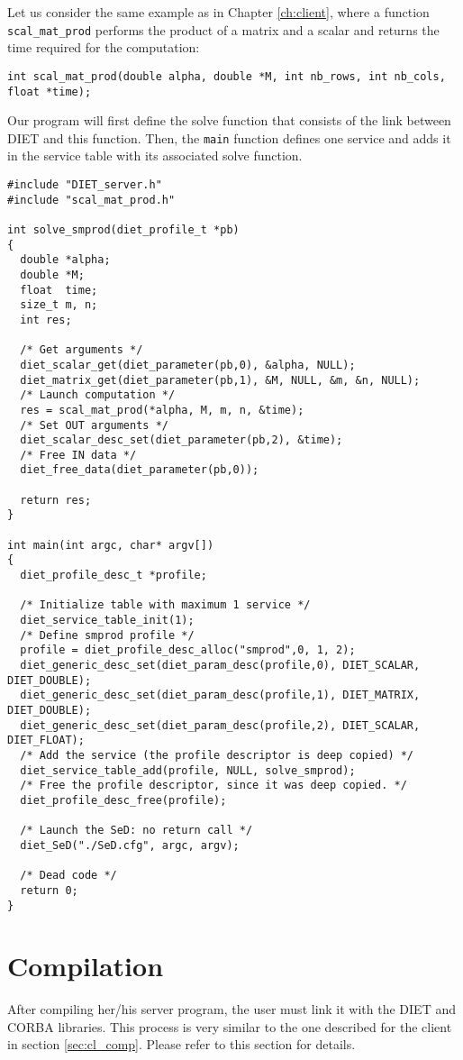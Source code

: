 Let us consider the same example as in Chapter \ref{ch:client}, where
a function \texttt{scal\_mat\_prod} performs the product of a matrix
and a scalar and returns the time required for the computation: {\footnotesize
\begin{verbatim}
int scal_mat_prod(double alpha, double *M, int nb_rows, int nb_cols, float *time);
\end{verbatim}
}
Our program will first define the solve function that consists of the link
between DIET and this function. Then, the \texttt{main} function defines one service and
adds it in the service table with its associated solve function.
{\footnotesize
\begin{verbatim}
#include "DIET_server.h"
#include "scal_mat_prod.h"

int solve_smprod(diet_profile_t *pb)
{
  double *alpha;
  double *M;
  float  time;
  size_t m, n;
  int res;

  /* Get arguments */
  diet_scalar_get(diet_parameter(pb,0), &alpha, NULL);
  diet_matrix_get(diet_parameter(pb,1), &M, NULL, &m, &n, NULL);
  /* Launch computation */
  res = scal_mat_prod(*alpha, M, m, n, &time);
  /* Set OUT arguments */
  diet_scalar_desc_set(diet_parameter(pb,2), &time);
  /* Free IN data */
  diet_free_data(diet_parameter(pb,0));

  return res;
}

int main(int argc, char* argv[])
{
  diet_profile_desc_t *profile;
  
  /* Initialize table with maximum 1 service */
  diet_service_table_init(1);
  /* Define smprod profile */
  profile = diet_profile_desc_alloc("smprod",0, 1, 2);
  diet_generic_desc_set(diet_param_desc(profile,0), DIET_SCALAR, DIET_DOUBLE);
  diet_generic_desc_set(diet_param_desc(profile,1), DIET_MATRIX, DIET_DOUBLE);
  diet_generic_desc_set(diet_param_desc(profile,2), DIET_SCALAR, DIET_FLOAT);
  /* Add the service (the profile descriptor is deep copied) */
  diet_service_table_add(profile, NULL, solve_smprod);
  /* Free the profile descriptor, since it was deep copied. */
  diet_profile_desc_free(profile);

  /* Launch the SeD: no return call */
  diet_SeD("./SeD.cfg", argc, argv);

  /* Dead code */
  return 0;
}
\end{verbatim}
}

\section{Compilation}
\label{sec:sv_comp}

After compiling her/his server program, the user must link it with the DIET
and CORBA libraries. This process is very similar to the one described
for the client in section \ref{sec:cl_comp}. Please refer to this section
for details.
